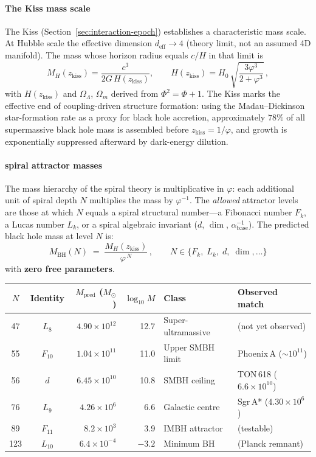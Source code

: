 \documentclass[12pt,a4paper]{article}
\begin{document}
\paragraph{The Kiss mass scale}

The Kiss (Section~\ref{sec:interaction-epoch}) establishes a characteristic mass scale. At Hubble scale the effective dimension $d_{\mathrm{eff}} \to 4$ (theory limit, not an assumed 4D manifold). The mass whose horizon radius equals $c/H$ in that limit is
\begin{equation}
M_H(z_{\mathrm{kiss}}) = \frac{c^3}{2G\,H(z_{\mathrm{kiss}})}, \qquad
H(z_{\mathrm{kiss}}) = H_0\,\sqrt{\frac{3\varphi^3}{2 + \varphi^3}}\,,
\end{equation}
with $H(z_{\mathrm{kiss}})$ and $\Omega_\Lambda$, $\Omega_m$ derived from $\Phi^2 = \Phi + 1$.  The Kiss marks the effective end of coupling-driven structure formation: using the Madau--Dickinson star-formation rate as a proxy for black hole accretion, approximately $78\%$ of all supermassive black hole mass is assembled before $z_{\mathrm{kiss}} = 1/\varphi$, and growth is exponentially suppressed afterward by dark-energy dilution.
\paragraph{spiral attractor masses}

The mass hierarchy of the spiral theory is multiplicative in $\varphi$: each additional unit of spiral depth $N$ multiplies the mass by $\varphi^{-1}$.  The \emph{allowed} attractor levels are those at which $N$ equals a spiral structural number---a Fibonacci number $F_k$, a Lucas number $L_k$, or a spiral algebraic invariant ($d$, $\dim$, $\alpha^{-1}_{\mathrm{base}}$).  The predicted black hole mass at level $N$ is:
\begin{equation}
\boxed{M_{\mathrm{BH}}(N) \;=\; \frac{M_H(z_{\mathrm{kiss}})}{\varphi^{\,N}}\,,
\qquad N \in \{F_k,\; L_k,\; d,\; \dim, \ldots\}}
\end{equation}
with \textbf{zero free parameters}.

\begin{center}\small
\begin{tabular}{cc rr ll}
\toprule
$N$ & Identity & $M_{\mathrm{pred}}$ ($M_\odot$) & $\log_{10} M$ & Class & Observed match \\
\midrule
47 & $L_8$ & $4.90\times 10^{12}$ & 12.7 & Super-ultramassive & (not yet observed) \\
55 & $F_{10}$ & $1.04\times 10^{11}$ & 11.0 & Upper SMBH limit & Phoenix\,A ($\sim 10^{11}$) \\
56 & $d$ & $6.45\times 10^{10}$ & 10.8 & SMBH ceiling & TON\,618 ($6.6\times 10^{10}$) \\
76 & $L_9$ & $4.26\times 10^{6}$ & 6.6 & Galactic centre & Sgr\,A* ($4.30\times 10^{6}$) \\
89 & $F_{11}$ & $8.2\times 10^{3}$ & 3.9 & IMBH attractor & (testable) \\
123 & $L_{10}$ & $6.4\times 10^{-4}$ & $-3.2$ & Minimum BH & (Planck remnant) \\
\bottomrule
\end{tabular}
\end{center}
\end{document}
